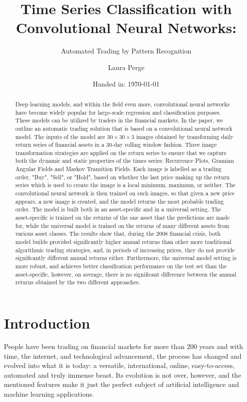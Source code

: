 \documentclass[12pt, a4paper]{article}
\author{Laura Perge}
\title{Time Series Classification with Convolutional Neural Networks:}
\subtitle{Automated Trading by Pattern Recognition}
\date{Handed in: \today}
\begin{document}
\maketitle
\tableofcontents

\newpage
\begin{abstract}
    Deep learning models, and within the field even more, convolutional neural networks have become widely popular for large-scale regression and classification purposes. These models can be utilized by traders in the financial markets. 
    In the paper, we outline an automatic trading solution that is based on a convolutional neural network model. 
    The inputs of the model are $30 \times 30 \times 3$ images obtained by transforming daily return series of financial assets in a 30-day rolling window fashion. Three image transformation strategies are applied on the return series to ensure that we capture both the dynamic and static properties of the times series: Recurrence Plots, Gramian Angular Fields and Markov Transition Fields. Each image is labelled as a trading order, "Buy", "Sell", or "Hold", based on whether the last price making up the return series which is used to create the image is a local minimum, maximum, or neither. 
    The convolutional neural network is then trained on such images, so that given a new price appears, a new image is created, and the model returns the most probable trading order. 
    The model is built both in an asset-specific and in a universal setting. The asset-specific is trained on the returns of the one asset that the predictions are made for, while the universal model is trained on the returns of many different assets from various asset classes.
    The results show that, during the 2008 financial crisis, both model builds provided significantly higher annual returns than other more traditional algorithmic trading strategies, and, in periods of increasing prices, they do not provide significantly different annual returns either.
    Furthermore, the universal model setting is more robust, and achieves better classification performance on the test set than the asset-specific, however, on average, there is no significant difference between the annual returns obtained by the two different approaches.
\end{abstract}
\newpage

\section{Introduction}
People have been trading on financial markets for more than 200 years and with time, the internet, and technological advancement, the process has changed and evolved into what it is today:  
a versatile, international, online, easy-to-access, automated and truly immense beast. Its evolution is not over, however, and the mentioned features make it just the perfect subject of 
artificial intelligence and machine learning applications. 
\end{document}
